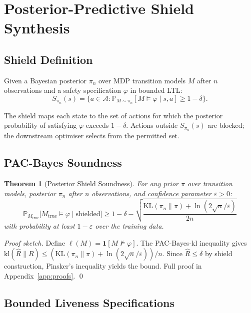 \documentclass[11pt]{article}
\newtheorem{theorem}{Theorem}
\newcommand{\KL}{\mathrm{KL}}
\newcommand{\Prob}{\mathbb{P}}
\newcommand{\cA}{\mathcal{A}}
\begin{document}
\section{Posterior-Predictive Shield Synthesis}\label{sec:shield}

\subsection{Shield Definition}

Given a Bayesian posterior $\pi_n$ over MDP transition models $M$ after
$n$ observations and a safety specification $\varphi$ in bounded LTL:
\begin{equation}\label{eq:shield}
  S_{\pi_n}(s) = \bigl\{a \in \cA :
    \Prob_{M \sim \pi_n}[M \models \varphi \mid s, a]
    \geq 1 - \delta \bigr\}.
\end{equation}

The shield maps each state to the set of actions for which the
posterior probability of satisfying $\varphi$ exceeds $1 - \delta$.
Actions outside $S_{\pi_n}(s)$ are blocked; the downstream optimiser
selects from the permitted set.

\subsection{PAC-Bayes Soundness}

\begin{theorem}[Posterior Shield Soundness]\label{thm:shield}
For any prior $\pi$ over transition models, posterior $\pi_n$ after $n$
observations, and confidence parameter $\varepsilon > 0$:
\begin{equation}\label{eq:pac}
  \Prob_{M_{\mathrm{true}}}\bigl[M_{\mathrm{true}} \models \varphi
  \mid \text{shielded}\bigr]
  \geq 1 - \delta -
  \sqrt{\frac{\KL(\pi_n \| \pi) + \ln(2\sqrt{n}/\varepsilon)}{2n}}
\end{equation}
with probability at least $1 - \varepsilon$ over the training data.
\end{theorem}

\noindent\emph{Proof sketch.}
Define $\ell(M) = \mathbf{1}[M \not\models \varphi]$.  The
PAC-Bayes-kl inequality gives
$\mathrm{kl}(\hat{R} \| R) \leq (\KL(\pi_n\|\pi) +
\ln(2\sqrt{n}/\varepsilon))/n$.
Since $\hat{R} \leq \delta$ by shield construction, Pinsker's
inequality yields the bound.  Full proof in
Appendix~\ref{app:proofs}. \qed

\subsection{Bounded Liveness Specifications}\label{sec:liveness}
\end{document}
